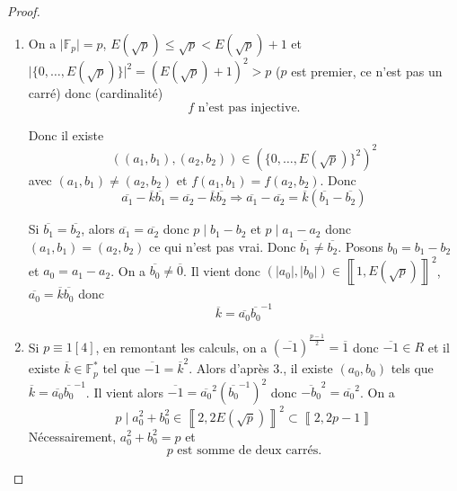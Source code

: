 \begin{proof}
\begin{enumerate}
		\item On a $\vert\mathbb{F}_{p}\vert=p$, $E(\sqrt{p})\leqslant\sqrt{p}<E(\sqrt{p})+1$ et $\vert\{0,\dots,E(\sqrt{p})\}\vert^{2}=(E(\sqrt{p})+1)^{2}>p$ ($p$ est premier, ce n'est pas un carré) donc (cardinalité)
		\begin{equation}
			\boxed{f\text{ n'est pas injective.}}
		\end{equation}
		
		Donc il existe 
		\begin{equation}
			((a_{1},b_{1}),(a_{2},b_{2}))\in(\{0,\dots,E(\sqrt{p})\}^{2})^{2}
		\end{equation} avec $(a_{1},b_{1})\neq (a_{2},b_{2})$ et $f(a_{1},b_{1})=f(a_{2},b_{2})$. Donc 
		\begin{equation}
			\overline{a_{1}}-\overline{k}\overline{b_{1}}=\overline{a_{2}}-\overline{k}\overline{b_{2}}\Rightarrow \overline{a_{1}}-\overline{a_{2}}=\overline{k}(\overline{b_{1}}-\overline{b_{2}})
		\end{equation}
		
		Si $\overline{b_{1}}=\overline{b_{2}}$, alors $\overline{a_{1}}=\overline{a_{2}}$ donc $p\mid b_{1}-b_{2}$ et $p\mid a_{1}-a_{2}$ donc $(a_{1},b_{1})=(a_{2},b_{2})$ ce qui n'est pas vrai. Donc $\overline{b_{1}}\neq\overline{b_{2}}$. Posons $b_{0}=b_{1}-b_{2}$ et $a_{0}=a_{1}-a_{2}$. On a $\overline{b_{0}}\neq\overline{0}$. Il vient donc $(\vert a_{0}\vert,\vert b_{0}\vert)\in\left\llbracket 1,E(\sqrt{p})\right\rrbracket^{2}$, $\overline{a_{0}}=\overline{k}\overline{b_{0}}$ donc 
		\begin{equation}
			\boxed{\overline{k}=\overline{a_{0}}\overline{b_{0}}^{-1}}
		\end{equation}

		\item Si $p\equiv 1[4]$, en remontant les calculs, on a $(\overline{-1})^{\frac{p-1}{2}}=\overline{1}$ donc $\overline{-1}\in R$ et il existe $\overline{k}\in\mathbb{F}_{p}^{*}$ tel que $\overline{-1}=\overline{k}^{2}$. Alors d'après 3., il existe $(a_{0},b_{0})$ tels que $\overline{k}=\overline{a_{0}}\overline{b_{0}}^{-1}$. Il vient alors $\overline{-1}=\overline{a_{0}}^{2}(\overline{b_{0}}^{-1})^{2}$ donc $\overline{-b_{0}}^{2}=\overline{a_{0}}^{2}$. On a 
		\begin{equation}
			p\mid a_{0}^{2}+b_{0}^{2}\in\left\llbracket 2,2E(\sqrt{p})\right\rrbracket^{2}\subset\left\llbracket 2,2p-1\right\rrbracket
		\end{equation}
		Nécessairement, $a_{0}^{2}+b_{0}^{2}=p$ et 
		\begin{equation}
			\boxed{p\text{ est somme de deux carrés.}}
		\end{equation}
	\end{enumerate}
\end{proof}

